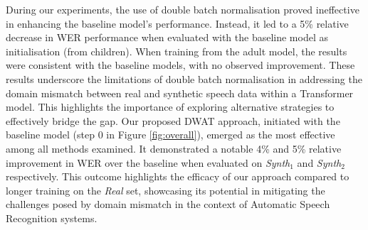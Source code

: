 During our experiments, the use of double batch normalisation proved ineffective in enhancing the baseline model's performance. Instead, it led to a 5\% relative decrease in WER performance when evaluated with the baseline model as initialisation (from children). When training from the adult model, the results were consistent  with the baseline models, with no observed improvement. These results underscore the limitations of double batch normalisation in addressing the domain mismatch between real and synthetic speech data within a Transformer model. This highlights the importance of exploring alternative strategies to effectively bridge the gap.
Our proposed DWAT approach, initiated with the baseline model (step 0 in Figure \ref{fig:overall}), emerged as the most effective among all methods examined. It demonstrated a notable 4\% and 5\% relative improvement in WER over the baseline when evaluated on \textit{Synth$_1$} and \textit{Synth$_2$} respectively. This outcome highlights the efficacy of our approach compared to longer training on the \textit{Real} set, showcasing its potential in mitigating the challenges posed by domain mismatch in the context of Automatic Speech Recognition systems.


